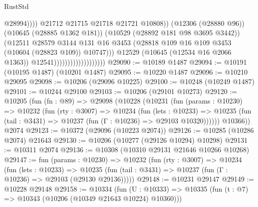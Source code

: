 \begin{lexlean}{RustStd}
\begin{coremodule}
                                                        @28994))))
                                                @21712
                                                @21715
                                                @21718
                                                @21721
                                                @10808))
                                            (@12306 (@28880 @96))
                                            (@10645 (@28885 @1362 @181))
                                            (@10529 (@28892 @181 @98 @3695 @3442))
                                            (@12511
                                              @28579
                                              @3144
                                              @131
                                              @16
                                              @3453
                                              (@28818
                                                @109
                                                @16
                                                @109
                                                @3453
                                                (@10604 (@28823 @109))
                                                @10747)))
                                          @12529
                                          (@10645 (@12534 @16 @2066 @1363))
                                          @12541)))))))))))))))))))
@29090 := @10189 @1487
@29094 := @10191 (@10195 @1487) (@10201 @1487)
@29095 := @10220 @1487
@29096 := @10210 @29095
@29098 := @10206 (@29096 @10225)
@29100 := @10248 (@10249 @1487)
@29101 := @10244 @29100
@29103 := @10206 (@29101 @10273)
@29120 := @10205
    (fun (fn : @89) =>
    @29098
      (@10228
        (@10231
          (fun (params : @10230) =>
          @10232
            (fun (rty : @3007) =>
            @10234
              (fun (lets : @10233) =>
              @10235 (fun (tail : @3431) => @10237 (fun (Γ : @10236) => @29103 @10320))))))
        @10366))
    @2074
@29123 := @10372 (@29096 (@10223 @2074))
@29126 := @10285 (@10286 @2074) @21643
@29130 := @10206 (@10277 (@29126 @10294) @10298)
@29131 := @10311 @2074
@29136 := @10308 (@10310 @29131 @21646 @10266 @10268)
@29147 := fun (params : @10230) =>
  @10232
    (fun (rty : @3007) =>
    @10234
      (fun (lets : @10233) =>
      @10235 (fun (tail : @3431) => @10237 (fun (Γ : @10236) => @29103 (@29130 @29136)))))
@29148 := @10231 @29147
@29149 := @10228 @29148
@29158 := @10334
    (fun (U : @10333) => @10335 (fun (t : @7) => @10343 (@10206 (@10349 @21643 @10224) @10360)))

\end{coremodule}
\end{lexlean}
